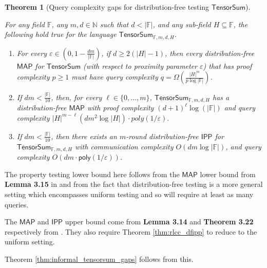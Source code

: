 \documentclass[11pt]{article}
\newtheorem{theorem}{Theorem}[section]
\newcommand{\poly}{\mathsf{poly}}
\newcommand{\IPP}{\mathsf{IPP}}
\newcommand{\MAP}{\mathsf{MAP}}
\newcommand{\TensorSum}{\mathsf{TensorSum}}
\newcommand{\F}{\mathbb{F}}
\newcommand{\N}{\mathbb{N}}
\begin{document}
\begin{theorem}[Query complexity gaps for distribution-free testing $\TensorSum$]
\label{thm:formal_tensorsum_gaps}

For any field $\F$, any $m,d \in \N$ such that $d < \vert \F \vert$, and any sub-field $H \subseteq \F$, the following hold true for the language $\TensorSum_{\F,m,d,H}$.
\begin{enumerate}
    \item For every $\varepsilon \in \left( 0, 1 - \frac{dm}{|\mathbb{F}|} \right)$, if $d \geq 2(|H| - 1)$, then every distribution-free $\MAP$ for $\TensorSum$ (with respect to proximity parameter $\varepsilon$) that has proof complexity $p \geq 1$ must have query complexity $q = \Omega \left( \frac{|H|^{m}}{p\log |\mathbb{F}|} \right)$. 
    \item If $dm < \frac{|\mathbb{F}|}{10}$, then, for every $\ell \in \{0, . . . , m\}$, $\TensorSum_{\mathbb{F},m,d,H}$ has a distribution-free $\MAP$ with proof complexity $(d+1)^{\ell} \log(|\mathbb{F}|)$ and query complexity $|H|^{m-\ell}(dm^{2} \log |H|)\cdot poly(1/\varepsilon).$ 
    \item If $dm < \frac{|\mathbb{F}|}{10}$, then there exists an $m$-round distribution-free $\IPP$ for $\TensorSum_{\mathbb{F},m,d,H}$ with communication complexity $O(dm \log |\mathbb{F}|)$, and query complexity $O(dm \cdot \poly(1/\varepsilon))$.
\end{enumerate}
\end{theorem}

The property testing lower bound here follows from the $\MAP$ lower bound from \textbf{Lemma 3.15} in \cite{GR18} and from the fact that distribution-free testing is a more general setting which encompasses uniform testing and so will require at least as many queries.

The $\MAP$ and $\IPP$ upper bound come from \textbf{Lemma 3.14} and \textbf{Theorem 3.22} respectively from \cite{GR18}.  They also require Theorem \ref{thm:rlcc_dfipp} to reduce to the uniform setting.

\noindent Theorem \ref{thm:informal_tensorsum_gaps} follows from this. 
\end{document}
